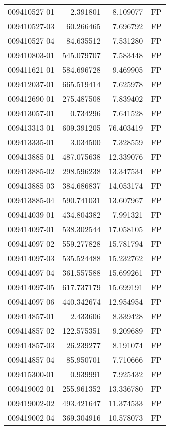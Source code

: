 \begin{tabular}{lrrl}
009410527-01 &    2.391801 &     8.109077 &   FP \\
009410527-03 &   60.266465 &     7.696792 &   FP \\
009410527-04 &   84.635512 &     7.531280 &   FP \\
009410803-01 &  545.079707 &     7.583448 &   FP \\
009411621-01 &  584.696728 &     9.469905 &   FP \\
009412037-01 &  665.519414 &     7.625978 &   FP \\
009412690-01 &  275.487508 &     7.839402 &   FP \\
009413057-01 &    0.734296 &     7.641528 &   FP \\
009413313-01 &  609.391205 &    76.403419 &   FP \\
009413335-01 &    3.034500 &     7.328559 &   FP \\
009413885-01 &  487.075638 &    12.339076 &   FP \\
009413885-02 &  298.596238 &    13.347534 &   FP \\
009413885-03 &  384.686837 &    14.053174 &   FP \\
009413885-04 &  590.741031 &    13.607967 &   FP \\
009414039-01 &  434.804382 &     7.991321 &   FP \\
009414097-01 &  538.302544 &    17.058105 &   FP \\
009414097-02 &  559.277828 &    15.781794 &   FP \\
009414097-03 &  535.524488 &    15.232762 &   FP \\
009414097-04 &  361.557588 &    15.699261 &   FP \\
009414097-05 &  617.737179 &    15.699191 &   FP \\
009414097-06 &  440.342674 &    12.954954 &   FP \\
009414857-01 &    2.433606 &     8.339428 &   FP \\
009414857-02 &  122.575351 &     9.209689 &   FP \\
009414857-03 &   26.239277 &     8.191074 &   FP \\
009414857-04 &   85.950701 &     7.710666 &   FP \\
009415300-01 &    0.939991 &     7.925432 &   FP \\
009419002-01 &  255.961352 &    13.336780 &   FP \\
009419002-02 &  493.421647 &    11.374533 &   FP \\
009419002-04 &  369.304916 &    10.578073 &   FP \\

\end{tabular}
